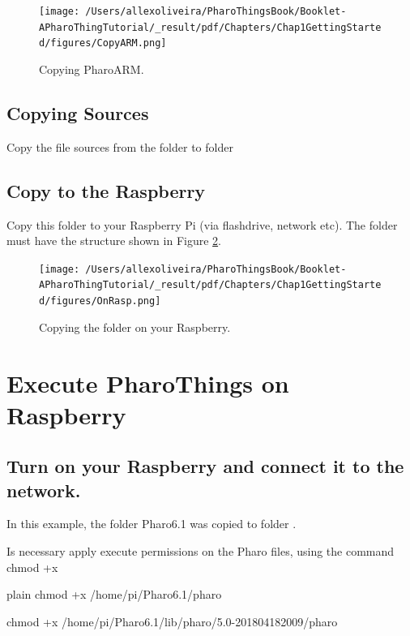 \documentclass[10pt,twoside,english]{_support/latex/sbabook/sbabook}
\begin{document}
\begin{figure}

\begin{center}
\texttt{[image: /Users/allexoliveira/PharoThingsBook/Booklet-APharoThingTutorial/\_result/pdf/Chapters/Chap1GettingStarted/figures/CopyARM.png]}\caption{Copying PharoARM.\label{CopyARM}}\end{center}
\end{figure}

\subsection{Copying Sources}
Copy the file sources from the folder  to folder 
\subsection{Copy to the Raspberry}
Copy this folder to your Raspberry Pi (via flashdrive, network etc). The folder must have the structure shown in Figure \ref{OnRasp}.


\begin{figure}

\begin{center}
\texttt{[image: /Users/allexoliveira/PharoThingsBook/Booklet-APharoThingTutorial/\_result/pdf/Chapters/Chap1GettingStarted/figures/OnRasp.png]}\caption{Copying the folder on your Raspberry.\label{OnRasp}}\end{center}
\end{figure}

\section{Execute PharoThings on Raspberry}\subsection{Turn on your Raspberry and connect it to the network.}
In this example, the folder Pharo6.1 was copied to folder .

Is necessary apply execute permissions on the Pharo files, using the command chmod +x

\begin{displaycode}{plain}
chmod +x /home/pi/Pharo6.1/pharo

chmod +x /home/pi/Pharo6.1/lib/pharo/5.0-201804182009/pharo
\end{displaycode}
\end{document}
